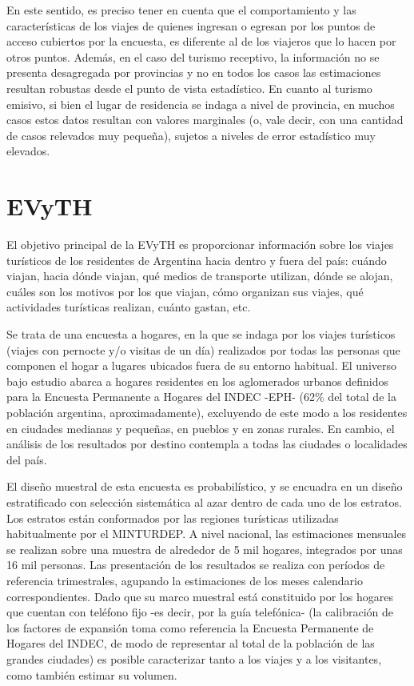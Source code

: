 \documentclass[
]{book}
\begin{document}
En este sentido, es preciso tener en cuenta que el comportamiento y las características de los viajes de quienes ingresan o egresan por los puntos de acceso cubiertos por la encuesta, es diferente al de los viajeros que lo hacen por otros puntos. Además, en el caso del turismo receptivo, la información no se presenta desagregada por provincias y no en todos los casos las estimaciones resultan robustas desde el punto de vista estadístico. En cuanto al turismo emisivo, si bien el lugar de residencia se indaga a nivel de provincia, en muchos casos estos datos resultan con valores marginales (o, vale decir, con una cantidad de casos relevados muy pequeña), sujetos a niveles de error estadístico muy elevados.

\hypertarget{evyth}{%
\section{EVyTH}\label{evyth}}

El objetivo principal de la EVyTH es proporcionar información sobre los viajes turísticos de los residentes de Argentina hacia dentro y fuera del país: cuándo viajan, hacia dónde viajan, qué medios de transporte utilizan, dónde se alojan, cuáles son los motivos por los que viajan, cómo organizan sus viajes, qué actividades turísticas realizan, cuánto gastan, etc.

Se trata de una encuesta a hogares, en la que se indaga por los viajes turísticos (viajes con pernocte y/o visitas de un día) realizados por todas las personas que componen el hogar a lugares ubicados fuera de su entorno habitual. El universo bajo estudio abarca a hogares residentes en los aglomerados urbanos definidos para la Encuesta Permanente a Hogares del INDEC -EPH- (62\% del total de la población argentina, aproximadamente), excluyendo de este modo a los residentes en ciudades medianas y pequeñas, en pueblos y en zonas rurales. En cambio, el análisis de los resultados por destino contempla a todas las ciudades o localidades del país.

El diseño muestral de esta encuesta es probabilístico, y se encuadra en un diseño estratificado con selección sistemática al azar dentro de cada uno de los estratos. Los estratos están conformados por las regiones turísticas utilizadas habitualmente por el MINTURDEP. A nivel nacional, las estimaciones mensuales se realizan sobre una muestra de alrededor de 5 mil hogares, integrados por unas 16 mil personas. Las presentación de los resultados se realiza con períodos de referencia trimestrales, agupando la estimaciones de los meses calendario correspondientes. Dado que su marco muestral está constituido por los hogares que cuentan con teléfono fijo -es decir, por la guía telefónica- (la calibración de los factores de expansión toma como referencia la Encuesta Permanente de Hogares del INDEC, de modo de representar al total de la población de las grandes ciudades) es posible caracterizar tanto a los viajes y a los visitantes, como también estimar su volumen.
\end{document}
